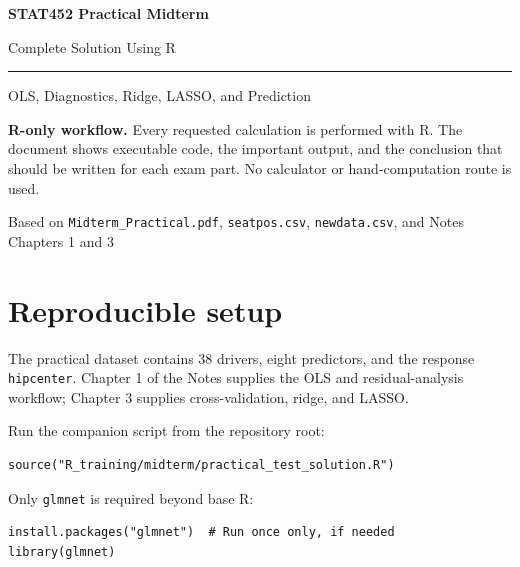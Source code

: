 ﻿\documentclass[11pt]{article}
\begin{document}
\hypersetup{pageanchor=false}

\begin{titlepage}
  \centering
  \vspace*{1.0in}
  {\sffamily\color{navy}\Huge\bfseries STAT452 Practical Midterm\par}
  \vspace{0.25in}
  {\sffamily\color{teal}\LARGE Complete Solution Using R\par}
  \vspace{0.5in}
  {\color{navy!45}\rule{0.78\textwidth}{1.1pt}\par}
  \vspace{0.5in}
  {\Large OLS, Diagnostics, Ridge, LASSO, and Prediction\par}
  \vfill
  \begin{minipage}{0.82\textwidth}
    \colorbox{navy!7}{\parbox{0.94\linewidth}{
      \textbf{R-only workflow.} Every requested calculation is performed with
      R. The document shows executable code, the important output, and the
      conclusion that should be written for each exam part. No calculator or
      hand-computation route is used.
    }}
  \end{minipage}
  \vfill
  {\sffamily\small Based on \texttt{Midterm\_Practical.pdf},
  \texttt{seatpos.csv}, \texttt{newdata.csv}, and Notes Chapters 1 and 3\par}
\end{titlepage}

\hypersetup{pageanchor=true}
\tableofcontents
\clearpage
{}

\section{Reproducible setup}

The practical dataset contains 38 drivers, eight predictors, and the response
\texttt{hipcenter}. Chapter 1 of the Notes supplies the OLS and residual-analysis
workflow; Chapter 3 supplies cross-validation, ridge, and LASSO.

Run the companion script from the repository root:

\begin{lstlisting}
source("R_training/midterm/practical_test_solution.R")
\end{lstlisting}

Only \texttt{glmnet} is required beyond base R:

\begin{lstlisting}
install.packages("glmnet")  # Run once only, if needed
library(glmnet)
\end{lstlisting}
\end{document}
